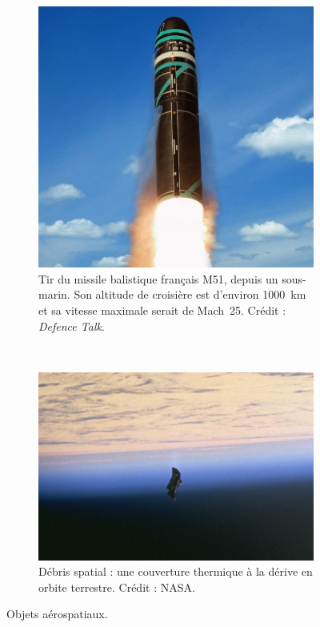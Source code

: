 	\begin{figure}[!htbp]
        \begin{subfigure}[t]{0.41\textwidth}
            \centering
            \includegraphics[width=\textwidth]{figures/ch1/m51}
        	\caption[Missile français M51]{Tir du missile balistique français M51, depuis un sous-marin. Son altitude de croisière est d'environ 1000~km et sa vitesse maximale serait de Mach~25\footnotemark. Crédit : \emph{Defence Talk}\footnotemark.}
            \label{fig:m51}
        \end{subfigure}
        ~
        \begin{subfigure}[t]{0.57\textwidth}
            \centering
            \includegraphics[width=\textwidth]{figures/ch1/space_debris_zoom}
            \caption[Débris spatial]{Débris spatial : une couverture thermique à la dérive en orbite terrestre. Crédit : NASA\protect\footnotemark.}
            \label{fig:spaceDeb}
        \end{subfigure}
        \label{fig:aerospace}
        \caption{Objets aérospatiaux.}
	\end{figure}
	
